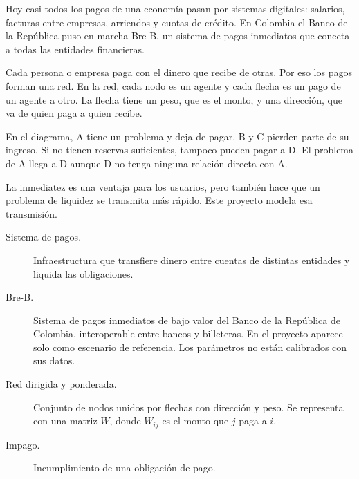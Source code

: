 \begin{decir}
Hoy casi todos los pagos de una economía pasan por sistemas digitales: salarios,
facturas entre empresas, arriendos y cuotas de crédito. En Colombia el Banco de la
República puso en marcha Bre-B, un sistema de pagos inmediatos que conecta a todas las
entidades financieras.

Cada persona o empresa paga con el dinero que recibe de otras. Por eso los pagos forman
una red. En la red, cada nodo es un agente y cada flecha es un pago de un agente a otro.
La flecha tiene un peso, que es el monto, y una dirección, que va de quien paga a quien
recibe.

En el diagrama, A tiene un problema y deja de pagar. B y C pierden parte de su ingreso.
Si no tienen reservas suficientes, tampoco pueden pagar a D. El problema de A llega a D
aunque D no tenga ninguna relación directa con A.

La inmediatez es una ventaja para los usuarios, pero también hace que un problema de
liquidez se transmita más rápido. Este proyecto modela esa transmisión.
\end{decir}
\begin{terminos}
\begin{description}
\item[Sistema de pagos.] Infraestructura que transfiere dinero entre cuentas de
distintas entidades y liquida las obligaciones.
\item[Bre-B.] Sistema de pagos inmediatos de bajo valor del Banco de la República de
Colombia, interoperable entre bancos y billeteras. En el proyecto aparece solo como
escenario de referencia. Los parámetros no están calibrados con sus datos.
\item[Red dirigida y ponderada.] Conjunto de nodos unidos por flechas con dirección y
peso. Se representa con una matriz $W$, donde $W_{ij}$ es el monto que $j$ paga a $i$.
\item[Impago.] Incumplimiento de una obligación de pago.
\end{description}
\end{terminos}
\begin{preguntas}
\end{preguntas}

